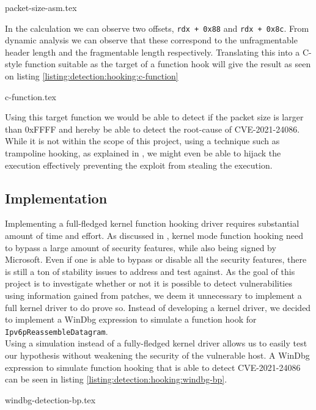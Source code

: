 \documentclass{report}
\begin{document}
{packet-size-asm.tex}

In the calculation we can observe two offsets, \texttt{rdx + 0x88} and \texttt{rdx + 0x8c}. From dynamic analysis we can observe that these correspond to the unfragmentable header length and the fragmentable length respectively. Translating this into a C-style function suitable as the target of a function hook will give the result as seen on listing \ref{listing:detection:hooking:c-function}

{c-function.tex}

Using this target function we would be able to detect if the packet size is larger than 0xFFFF and hereby be able to detect the root-cause of CVE-2021-24086. While it is not within the scope of this project, using a technique such as trampoline hooking, as explained in , we might even be able to hijack the execution effectively preventing the exploit from stealing the execution.

\subsection{Implementation}
Implementing a full-fledged kernel function hooking driver requires substantial amount of time and effort. As discussed in , kernel mode function hooking need to bypass a large amount of security features, while also being signed by Microsoft. Even if one is able to bypass or disable all the security features, there is still a ton of stability issues to address and test against. As the goal of this project is to investigate whether or not it is possible to detect vulnerabilities using information gained from patches, we deem it unnecessary to implement a full kernel driver to do prove so. Instead of developing a kernel driver, we decided to implement a WinDbg expression\cite{url:windbg:expression} to simulate a function hook for \texttt{Ipv6pReassembleDatagram}.
\\
Using a simulation instead of a fully-fledged kernel driver allows us to easily test our hypothesis without weakening the security of the vulnerable host. A WinDbg expression to simulate function hooking that is able to detect CVE-2021-24086 can be seen in listing \ref{listing:detection:hooking:windbg-bp}.

{windbg-detection-bp.tex}
\end{document}
